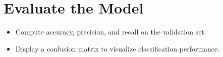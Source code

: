 \documentclass[11pt]{article}
\begin{document}
\section{Evaluate the Model}
\label{sec:org84ddabb}
\begin{itemize}
\item Compute accuracy, precision, and recall on the
validation set.
\item Display a confusion matrix to visualize
classification performance.
\end{itemize}
\end{document}
